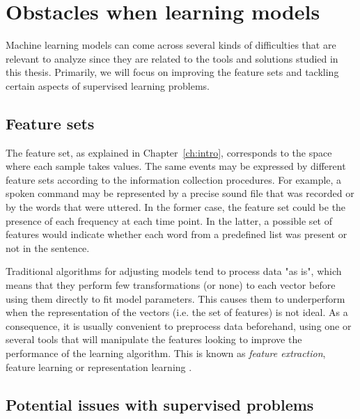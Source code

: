 
\section{Obstacles when learning models}

Machine learning models can come across several kinds of difficulties that are relevant to analyze since they are related to the tools and solutions studied in this thesis. Primarily, we will focus on improving the feature sets and tackling certain aspects of supervised learning problems.

\subsection{Feature sets}

The feature set, as explained in Chapter~\ref{ch:intro}, corresponds to the space where each sample takes values. The same events may be expressed by different feature sets according to the information collection procedures. For example, a spoken command may be represented by a precise sound file that was recorded or by the words that were uttered. In the former case, the feature set could be the presence of each frequency at each time point. In the latter, a possible set of features would indicate whether each word from a predefined list was present or not in the sentence.

Traditional algorithms for adjusting models tend to process data "as is", which means that they perform few transformations (or none) to each vector before using them directly to fit model parameters. This causes them to underperform when the representation of the vectors (i.e. the set of features) is not ideal. As a consequence, it is usually convenient to preprocess data beforehand, using one or several tools that will manipulate the features looking to improve the performance of the learning algorithm. This is known as \textit{feature extraction}, feature learning or representation learning . 

\subsection{Potential issues with supervised problems}

